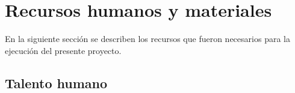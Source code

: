 	
	
	
	
	


\section{Recursos humanos y materiales}

En la siguiente sección se describen los recursos que fueron necesarios para la ejecución del presente proyecto.

\subsection{Talento humano}

